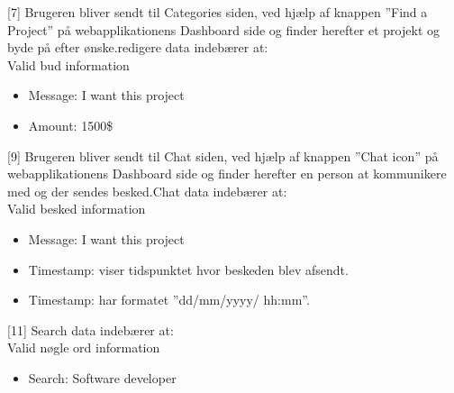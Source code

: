 [7] Brugeren bliver sendt til Categories siden, ved hjælp af knappen ''Find a Project'' på webapplikationens Dashboard side og finder herefter et projekt og byde på efter ønske.\newline \newline
[8] redigere data indebærer at:\\
Valid bud information
\begin{itemize}
	\item Message: I want this project
    \item Amount: 1500\$
    
\end{itemize}

[9] Brugeren bliver sendt til Chat siden, ved hjælp af knappen ''Chat icon'' på webapplikationens Dashboard side og finder herefter en person at kommunikere med og der sendes besked.\newline \newline
[10] Chat data indebærer at:\\
Valid besked information
\begin{itemize}
	\item Message: I want this project
    \item Timestamp: viser tidspunktet hvor beskeden blev afsendt.
	\item Timestamp: har formatet ''dd/mm/yyyy/ hh:mm''.

\end{itemize}

[11] Search data indebærer at:\\
Valid nøgle ord information
\begin{itemize}
	\item Search: Software developer

\end{itemize}


